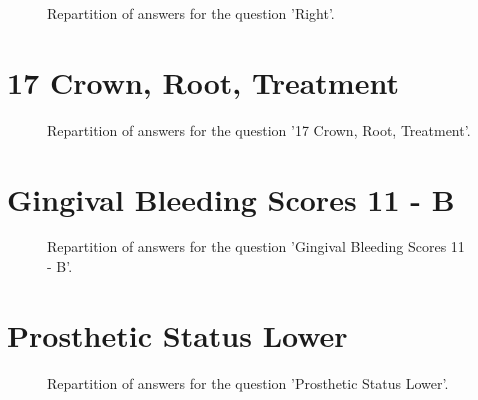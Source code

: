 \documentclass[12pt]{article}
\begin{document}
\label{sec:247}


\begin{figure}[h!]
    \caption{\label{figure:q247-1}Repartition of answers for the question 'Right'.}
\end{figure}



\clearpage{}
\section{17
Crown, Root, Treatment}

\label{sec:26}


\begin{figure}[h!]
    \caption{\label{figure:q26-1}Repartition of answers for the question '17
Crown, Root, Treatment'.}
\end{figure}



\clearpage{}
\section{Gingival Bleeding Scores
11 - B}

\label{sec:59}


\begin{figure}[h!]
    \caption{\label{figure:q59-1}Repartition of answers for the question 'Gingival Bleeding Scores
11 - B'.}
\end{figure}



\clearpage{}
\section{Prosthetic Status
Lower}

\label{sec:70}


\begin{figure}[h!]
    \caption{\label{figure:q70-1}Repartition of answers for the question 'Prosthetic Status
Lower'.}
\end{figure}
\end{document}
